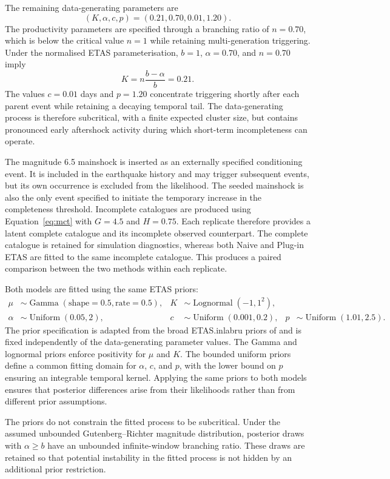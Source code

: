 \documentclass{statsmsc}
\begin{document}
The remaining data-generating parameters are
\[
(K,\alpha,c,p)=(0.21,0.70,0.01,1.20).
\]
The productivity parameters are specified through a branching ratio of
\(n=0.70\), which is below the critical value \(n=1\) while retaining
multi-generation triggering. Under the normalised ETAS parameterisation,
\(b=1\), \(\alpha=0.70\), and \(n=0.70\) imply
\[
K=n\frac{b-\alpha}{b}=0.21.
\]
The values \(c=0.01\) days and \(p=1.20\) concentrate triggering shortly
after each parent event while retaining a decaying temporal tail. The
data-generating process is therefore subcritical, with a finite expected
cluster size, but contains pronounced early aftershock activity during which
short-term incompleteness can operate.

The magnitude 6.5 mainshock is inserted as an externally specified
conditioning event. It is included in the earthquake history and may trigger
subsequent events, but its own occurrence is excluded from the likelihood.
The seeded mainshock is also the only event specified to initiate the
temporary increase in the completeness threshold. Incomplete catalogues are
produced using Equation~\eqref{eq:mct} with \(G=4.5\) and \(H=0.75\). Each
replicate therefore provides a latent complete catalogue and its incomplete
observed counterpart. The complete catalogue is retained for simulation
diagnostics, whereas both Naive and Plug-in ETAS are fitted to the same
incomplete catalogue. This produces a paired comparison between the two
methods within each replicate.

Both models are fitted using the same ETAS priors:
\[
\begin{aligned}
\mu&\sim\operatorname{Gamma}(\text{shape}=0.5,\text{rate}=0.5),&
K&\sim\operatorname{Lognormal}(-1,1^2),\\
\alpha&\sim\operatorname{Uniform}(0.05,2),&
c&\sim\operatorname{Uniform}(0.001,0.2),&
p&\sim\operatorname{Uniform}(1.01,2.5).
\end{aligned}
\]
The prior specification is adapted from the broad ETAS.inlabru priors of
\citet{naylor2023} and is fixed independently of the data-generating parameter
values. The Gamma and lognormal priors enforce positivity for \(\mu\) and
\(K\). The bounded uniform priors define a common fitting domain for
\(\alpha\), \(c\), and \(p\), with the lower bound on \(p\) ensuring an
integrable temporal kernel. Applying the same priors to both models ensures
that posterior differences arise from their likelihoods rather than from
different prior assumptions.

The priors do not constrain the fitted process to be subcritical. Under the
assumed unbounded Gutenberg--Richter magnitude distribution, posterior draws
with \(\alpha\geq b\) have an unbounded infinite-window branching ratio.
These draws are retained so that potential instability in the fitted process
is not hidden by an additional prior restriction.
\end{document}
